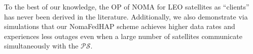 \documentclass[letter,journal]{IEEEtran}
\begin{document}
To the best of our knowledge, the OP of NOMA  for LEO satellites as ``clients'' has never been derived in the literature. Additionally, we also demonstrate via simulations that our NomaFedHAP scheme achieves higher data rates and experiences less outages even when a large number of satellites communicate simultaneously with the $\mathcal{PS}$.  %
\end{document}
